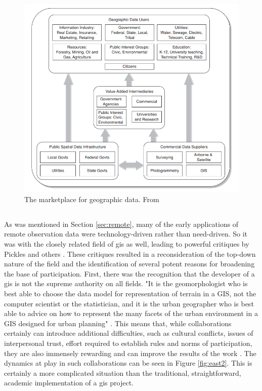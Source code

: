\begin{figure}[h]
	\centering
	\includegraphics[scale=0.4]{Figures/chap2/GISMarketplace.png}
	\caption[The marketplace for geographic data]{The marketplace for geographic data. From \cite{cowenAvailabilityGeographicData2007}}
	\label{fig:marketplace}
\end{figure}

\subsection{} \label{sec:collaborative}

As was mentioned in Section \ref{sec:remote}, many of the early applications of remote observation data were technology-driven rather than need-driven. So it was with the closely related field of \ac{gis} as well, leading to powerful critiques by Pickles and others \cite{picklesGroundTruthSocial1994}. These critiques resulted in a reconsideration of the top-down nature of the field and the identification of several potent reasons for broadening the base of participation. First, there was the recognition that the developer of a \ac{gis} is not the supreme authority on all fields. "It is the geomorphologist who is best able to choose the data model for representation of terrain in a GIS, not the computer scientist or the statistician, and it is the urban geographer who is best able to advice on how to represent the many facets of the urban environment in a GIS designed for urban planning" \cite{goodchildGeographicInformationSystems1994}. This means that, while collaborations certainly can introduce additional difficulties, such as cultural conflicts, issues of interpersonal trust, effort required to establish rules and norms of participation, they are also immensely rewarding and can improve the results of the work \cite{tullochInstitutionalGeographicInformation2007}. The dynamics at play in such collaborations can be seen in Figure \ref{fig:east2}. This is certainly a more complicated situation than the traditional, straightforward, academic implementation of a \ac{gis} project.

